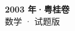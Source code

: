 \documentclass[zihao=-4, a4paper]{ctexart}
\begin{document}
\begin{center}
  {\Large\bfseries 2003 年·粤桂卷}\\[4pt]
  {\large 数学 · 试题版}
\end{center}
\medskip
{}

\end{document}

